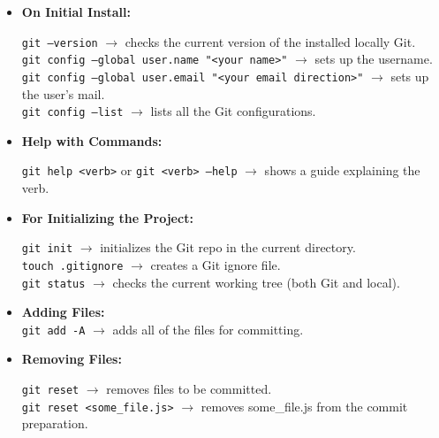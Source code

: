 \documentclass{article}
\begin{document}
    \begin{itemize}
    	\item \textbf{On Initial Install:}\\
    	    \begin{doublespace}
    	      {\tt git --version} $\rightarrow$ checks the current version of the installed locally Git.\\
    	      {\tt git config --global user.name "<your name>"} $\rightarrow$ sets up the username.\\
    	      {\tt git config --global user.email "<your email direction>"} $\rightarrow$ sets up the user's mail.\\
    	      {\tt git config --list} $\rightarrow$ lists all the Git configurations.
    	    \end{doublespace}
        
    	\item \textbf{Help with Commands:}\\
    	    \begin{doublespace}
    	    	{\tt git help <verb>} or {\tt git <verb> --help} $\rightarrow$ shows a guide explaining the verb.
    	    \end{doublespace}
        
        \item \textbf{For Initializing the Project:}\\
            \begin{doublespace}
        	    {\tt git init} $\rightarrow$ initializes the Git repo in the current directory.\\
        	    {\tt touch .gitignore} $\rightarrow$ creates a Git ignore file.\\
        	    {\tt git status} $\rightarrow$ checks the current working tree (both Git and local).
            \end{doublespace}
        
        \item \textbf{Adding Files:}\\
        	{\tt git add -A} $\rightarrow$ adds all of the files for committing.
        	
        \item \textbf{Removing Files:}\\
            \begin{doublespace}
        	    {\tt git reset} $\rightarrow$ removes files to be committed.\\
        	    {\tt git reset <some\_file.js>} $\rightarrow$ removes some\_file.js from the commit preparation.
            \end{doublespace}
    	

\end{itemize}
\end{document}
